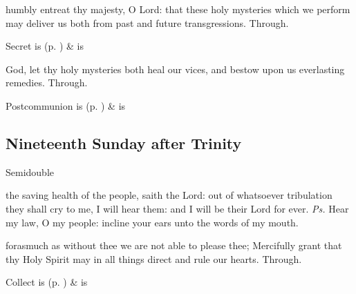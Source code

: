 
\secret
{} humbly entreat thy majesty, O Lord: that these holy mysteries which we perform may deliver us both from past and future transgressions. Through.
\begin{rubric}
     Secret is  (p. \pageref{SPSaints}) \&  is 
\end{rubric}


\postcommunion
{} God, let thy holy mysteries both heal our vices, and bestow upon us everlasting remedies. Through.


\begin{rubric}
     Postcommunion is  (p. \pageref{SPSaints}) \&  is 
\end{rubric}


\clearpage
\subsection{Nineteenth Sunday after Trinity}
\begin{inhead}
{Semidouble}
\end{inhead}


\introit
{} the saving health of the people, saith the Lord: out of whatsoever tribulation they shall cry to me, I will hear them: and I will be their Lord for ever. \textit{Ps.} Hear my law, O my people: incline your ears unto the words of my mouth.

\collect
{} forasmuch as without thee we are not able to please thee; Mercifully grant that thy Holy Spirit may in all things direct and rule our hearts. Through.
\begin{rubric}
     Collect is  (p. \pageref{SPSaints}) \&  is 
\end{rubric}

